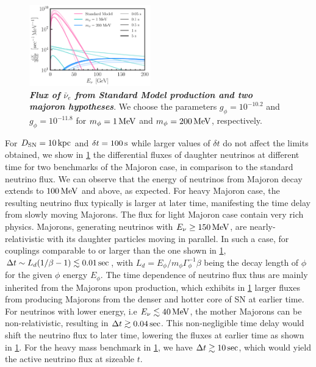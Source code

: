 \begin{figure}[t!]
    \centering
    \includegraphics[width=0.47\textwidth]{figures/majoran_fluxes.pdf}
    \caption{\textit{\textbf{Flux of $\bar{\nu}_{e}$ from Standard Model production and two majoron hypotheses}}.
    We choose the parameters $g_\phi = 10^{-10.2}$ and $g_\phi = 10^{-11.8}$ for $m_\phi = \unit[1]{MeV}$ and $m_\phi = \unit[200]{MeV}$, respectively.
    }
    \label{fig:fluxes}
\end{figure}

For $D_{\rm SN} = \unit[10]{kpc}$ and $\delta t = \unit[100]{s}$ while larger values of $\delta t$ do not affect the limits obtained, we show in \cref{fig:fluxes} the differential fluxes of daughter neutrinos at different time for two benchmarks of the Majoron case, in comparison to the standard neutrino flux.
We can observe that the energy of neutrinos from Majoron decay extends to $\unit[100]{MeV}$ and above, as expected. For heavy Majoron case, the resulting neutrino flux typically is larger at later time, manifesting the time delay from slowly moving Majorons. 
The flux for light Majoron case contain very rich physics. Majorons, generating neutrinos with $E_\nu \geq \unit[150]{MeV}$, are nearly-relativistic with its daughter particles moving in parallel. In such a case, for couplings comparable to or larger than the one shown in \cref{fig:fluxes}, $\Delta t \sim L_d (1/\beta -1)\lesssim \unit[0.01]{sec}$, with $L_d = E_\phi/m_\phi \Gamma^{-1}_\phi \beta$ being the decay length of $\phi$ for the given $\phi$ energy $E_\phi$. The time dependence of neutrino flux thus are mainly inherited from the Majorons upon production, which exhibits in \cref{fig:fluxes} larger fluxes from producing Majorons from the denser and hotter core of SN at earlier time.
For neutrinos with lower energy, i.e $E_\nu \lesssim \unit[40]{MeV}$, the mother Majorons can be non-relativistic, resulting in $\Delta t \gtrsim \unit[0.04]{sec}$. This non-negligible time delay would shift the neutrino flux to later time, lowering the fluxes at earlier time as shown in \cref{fig:fluxes}. For the heavy mass benchmark in \cref{fig:fluxes}, we have $\Delta t \gtrsim \unit[10]{sec}$, which would yield the active neutrino flux at sizeable $t$.

